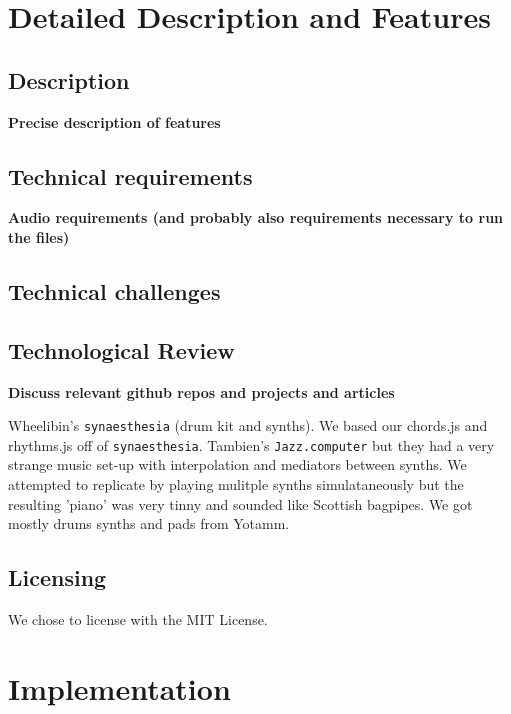 \documentclass[12pt,a4paper]{article}
\newcommand{\lightcode}[1]{\colorbox{light-gray}{\texttt{#1}}}
\begin{document}

\section{Detailed Description and Features}

\subsection{Description}
\textbf{Precise description of features}


\subsection{Technical requirements}
\textbf{Audio requirements (and probably also requirements necessary to run the files)}
\subsection{Technical challenges}
\subsection{Technological Review}
\textbf{Discuss relevant github repos and projects and articles}

Wheelibin's \lightcode{synaesthesia} (drum kit and synths). We based our chords.js and rhythms.js off of \lightcode{synaesthesia}. Tambien's \lightcode{Jazz.computer} but they had a very strange music set-up with interpolation and mediators between synths. We attempted to replicate by playing mulitple synths simulataneously but the resulting 'piano' was very tinny and sounded like Scottish bagpipes. We got mostly drums synths and pads from Yotamm.

\subsection{Licensing}

We chose to license with the MIT License.


\section{Implementation}
\end{document}
